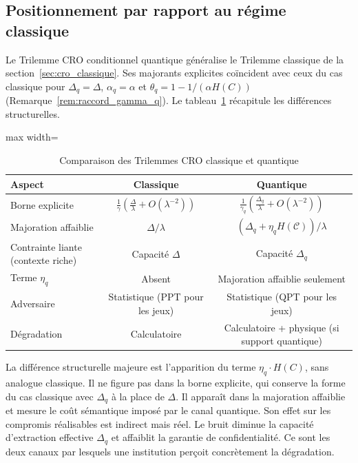 \subsection{Positionnement par rapport au r\'egime classique}
\label{subsec:transition_classique_quantique}
\begin{sloppypar}
Le Trilemme CRO conditionnel quantique g\'en\'eralise le Trilemme classique
de la section~\ref{sec:cro_classique}. Ses majorants explicites co\"incident avec ceux
du cas classique pour $\Delta_q = \Delta$, $\alpha_q = \alpha$ et
$\theta_q = 1 - 1/(\alpha H(C))$ (Remarque~\ref{rem:raccord_gamma_q}).
Le tableau~\ref{tab:comparaison_classique_quantique} r\'ecapitule les
diff\'erences structurelles.

\begin{table}[htbp]
\centering
\caption{Comparaison des Trilemmes CRO classique et quantique}
\label{tab:comparaison_classique_quantique}
\small
\setlength{\tabcolsep}{4pt} %
\begin{adjustbox}{max width=\linewidth} %
\begin{tabular}{@{}>{\raggedright\arraybackslash}p{4.5cm}cc@{}}
\toprule
\textbf{Aspect} & \textbf{Classique} & \textbf{Quantique} \\
\midrule
Borne explicite & $\frac{1}{\gamma}\left(\frac{\Delta}{\lambda} + O(\lambda^{-2})\right)$ & $\frac{1}{\gamma_q}\left(\frac{\Delta_q}{\lambda} + O(\lambda^{-2})\right)$ \\
Majoration affaiblie & $\Delta/\lambda$ & $(\Delta_q + \eta_q H(\mathcal{C}))/\lambda$ \\
Contrainte liante (contexte riche) & Capacit\'e $\Delta$ & Capacit\'e $\Delta_q$ \\
Terme $\eta_q$ & Absent & Majoration affaiblie seulement \\
Adversaire & Statistique (PPT pour les jeux) & Statistique (QPT pour les jeux) \\
D\'egradation & Calculatoire & Calculatoire + physique (si support quantique) \\
\bottomrule
\end{tabular}
\end{adjustbox}
\end{table}
La diff\'erence structurelle majeure est l'apparition du terme
$\eta_q \cdot H(C)$, sans analogue classique. Il ne figure pas dans la
borne explicite, qui conserve la forme du cas classique avec $\Delta_q$ \`a
la place de $\Delta$. Il appara\^it dans la majoration affaiblie et
mesure le co\^ut s\'emantique impos\'e par le canal quantique. Son effet
sur les compromis r\'ealisables est indirect mais r\'eel. Le bruit
diminue la capacit\'e d'extraction effective $\Delta_q$ et affaiblit la
garantie de confidentialit\'e. Ce sont les deux canaux par lesquels une institution
per\c{c}oit concr\`etement la d\'egradation.
\end{sloppypar}

